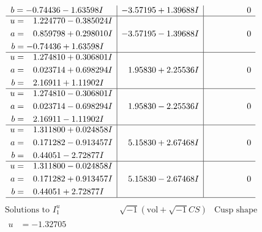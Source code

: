 \documentclass[1p]{elsarticle_modified}
\theoremstyle{definition}
\newcommand{\I}{\sqrt{-1}}
\begin{document}
$$\begin{array}{c|c|c}
\begin{aligned}
b &= -0.74436 - 1.63598 I\end{aligned}
 & -3.57195 + 1.39688 I & \phantom{-0.000000 } 0 \\ \hline\begin{aligned}
u &= \phantom{-}1.224770 - 0.385024 I \\
a &= \phantom{-}0.859798 + 0.298010 I \\
b &= -0.74436 + 1.63598 I\end{aligned}
 & -3.57195 - 1.39688 I & \phantom{-0.000000 } 0 \\ \hline\begin{aligned}
u &= \phantom{-}1.274810 + 0.306801 I \\
a &= \phantom{-}0.023714 + 0.698294 I \\
b &= \phantom{-}2.16911 + 1.11902 I\end{aligned}
 & \phantom{-}1.95830 + 2.25536 I & \phantom{-0.000000 } 0 \\ \hline\begin{aligned}
u &= \phantom{-}1.274810 - 0.306801 I \\
a &= \phantom{-}0.023714 - 0.698294 I \\
b &= \phantom{-}2.16911 - 1.11902 I\end{aligned}
 & \phantom{-}1.95830 - 2.25536 I & \phantom{-0.000000 } 0 \\ \hline\begin{aligned}
u &= \phantom{-}1.311800 + 0.024858 I \\
a &= \phantom{-}0.171282 - 0.913457 I \\
b &= \phantom{-}0.44051 - 2.72877 I\end{aligned}
 & \phantom{-}5.15830 + 2.67468 I & \phantom{-0.000000 } 0 \\ \hline\begin{aligned}
u &= \phantom{-}1.311800 - 0.024858 I \\
a &= \phantom{-}0.171282 + 0.913457 I \\
b &= \phantom{-}0.44051 + 2.72877 I\end{aligned}
 & \phantom{-}5.15830 - 2.67468 I & \phantom{-0.000000 } 0\\
 \hline 
 \end{array}$$\newpage$$\begin{array}{c|c|c}  
\text{Solutions to }I^u_{1}& \I (\text{vol} + \sqrt{-1}CS) & \text{Cusp shape}\\
 \hline 
\begin{aligned}
u &= -1.32705\phantom{ +0.000000I} \\

\end{aligned}
\end{array}$$
\end{document}
